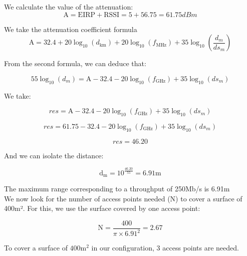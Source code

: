 \documentclass[12]{article}
\begin{document}
We calculate the value of the attenuation:
\begin{equation*}
    \text{A}= \text{EIRP}+\text{RSSI}= 5 + 56.75 = 61.75dBm
\end{equation*}

We take the attenuation coefficient formula
\begin{equation*}
    \text{A} = 32.4 + 20 \log_{10}(d_\text{km}) + 20 \log_{10}(f_\text{MHz}) + 35 \log_{10} \left( \frac{d_m}{ds_m} \right)
\end{equation*}

From the second formula, we can deduce that:

\begin{equation*}
    55 \log_{10} \left( d_m \right) = \text{A} - 32.4 - 20 \log_{10}(f_\text{GHz}) + 35 \log_{10} \left( ds_m \right)
\end{equation*}

We take:

\begin{equation*}
    res = \text{A} - 32.4 - 20 \log_{10}(f_\text{GHz}) + 35 \log_{10} \left( ds_m \right)
\end{equation*}

\begin{equation*}
    res = 61.75 - 32.4 - 20 \log_{10}(f_\text{GHz}) + 35 \log_{10} \left( ds_m \right)
\end{equation*}

\begin{equation*}
    res = 46.20
\end{equation*}

And we can isolate the distance:

\begin{equation*}
    \text{d}_\text{m} = 10^{\frac{46.20}{55}} = 6.91 \text{m}
\end{equation*}

The maximum range corresponding to a throughput of 250Mb/s is 6.91m \\

We now look for the number of access points needed (N) to cover a surface of 400m². For this, we use the surface covered by one access point:

\begin{equation*}
    \text{N} = \frac{400}{\pi \times 6.91^2} = 2.67
\end{equation*}

To cover a surface of $400 \text{m}^2$ in our configuration, 3 access points are needed.
\end{document}
